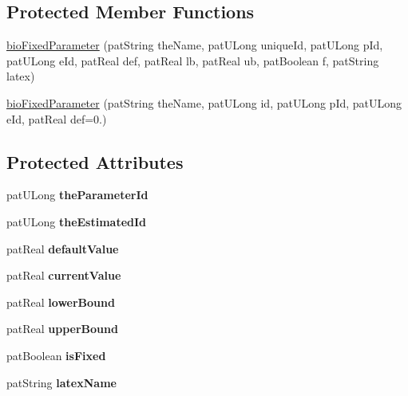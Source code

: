 \subsection*{Protected Member Functions}
\begin{DoxyCompactItemize}
\item 
\hyperlink{classbio_fixed_parameter_aec756782840347fa817e369dc8f92f12}{bio\+Fixed\+Parameter} (pat\+String the\+Name, pat\+U\+Long unique\+Id, pat\+U\+Long p\+Id, pat\+U\+Long e\+Id, pat\+Real def, pat\+Real lb, pat\+Real ub, pat\+Boolean f, pat\+String latex)
\item 
\hyperlink{classbio_fixed_parameter_a132679ea6cf49e582159c64e8264a475}{bio\+Fixed\+Parameter} (pat\+String the\+Name, pat\+U\+Long id, pat\+U\+Long p\+Id, pat\+U\+Long e\+Id, pat\+Real def=0.)
\end{DoxyCompactItemize}
\subsection*{Protected Attributes}
\begin{DoxyCompactItemize}
\item 
\mbox{\label{classbio_fixed_parameter_ab9d336e443309e424e12174b58e2af43}} 
pat\+U\+Long {\bfseries the\+Parameter\+Id}
\item 
\mbox{\label{classbio_fixed_parameter_aa2c92673aedfc4aeca0b6dffb983bd5e}} 
pat\+U\+Long {\bfseries the\+Estimated\+Id}
\item 
\mbox{\label{classbio_fixed_parameter_aa2520f9d22303b24442d1e7fd7c35429}} 
pat\+Real {\bfseries default\+Value}
\item 
\mbox{\label{classbio_fixed_parameter_ae5a560fc05db936e22235283aa0cbb1e}} 
pat\+Real {\bfseries current\+Value}
\item 
\mbox{\label{classbio_fixed_parameter_a57595399f5db3e400fc8499b6e7764fa}} 
pat\+Real {\bfseries lower\+Bound}
\item 
\mbox{\label{classbio_fixed_parameter_aebe297c6bcc34b6952e7c76284e31dd2}} 
pat\+Real {\bfseries upper\+Bound}
\item 
\mbox{\label{classbio_fixed_parameter_a15ee783919ffbcb256c1ea3ea28d7ce4}} 
pat\+Boolean {\bfseries is\+Fixed}
\item 
\mbox{\label{classbio_fixed_parameter_abb84650d18622a8c4ba1f407864fe637}} 
pat\+String {\bfseries latex\+Name}
\end{DoxyCompactItemize}
